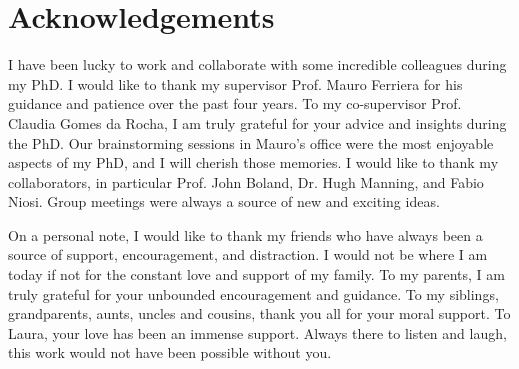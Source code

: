 




\begingroup

\let\clearpage\relax
 \let\cleardoublepage\relax
 \let\cleardoublepage\relax

\chapter*{Acknowledgements} %

I have been lucky to work and collaborate with some incredible colleagues during my PhD. I would like to thank my supervisor Prof. Mauro Ferriera for his guidance and patience over the past four years. To my co-supervisor Prof. Claudia Gomes da Rocha, I am truly grateful for your advice and insights during the PhD. Our brainstorming sessions in Mauro's office were the most enjoyable aspects of my PhD, and I will cherish those memories. I would like to thank my collaborators, in particular Prof. John Boland, Dr. Hugh Manning, and Fabio Niosi. Group meetings were always a source of new and exciting ideas.

On a personal note, I would like to thank my friends who have always been a source of support, encouragement, and distraction. I would not be where I am today if not for the constant love and support of my family. To my parents, I am truly grateful for your unbounded encouragement and guidance. To my siblings, grandparents, aunts, uncles and cousins, thank you all for your moral support. To Laura, your love has been an immense support. Always there to listen and laugh, this work would not have been possible without you.

\endgroup
